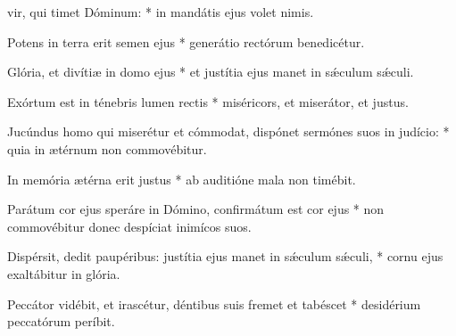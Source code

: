 \begin{psalmus}

     vir, qui timet Dóminum: * in mandátis ejus volet nimis.

    Potens in terra erit semen ejus * generátio rectórum benedicétur.

    Glória, et divítiæ in domo ejus * et justítia ejus manet in sǽculum sǽculi.

    Exórtum est in ténebris lumen rectis * miséricors, et miserátor, et justus.

    Jucúndus homo qui miserétur et cómmodat, dispónet sermónes suos in judício: * quia in ætérnum non commovébitur.

    In memória ætérna erit justus * ab auditióne mala non timébit.

    Parátum cor ejus speráre in Dómino, confirmátum est cor ejus * non commovébitur donec despíciat inimícos suos.

    Dispérsit, dedit paupéribus: justítia ejus manet in sǽculum sǽculi, * cornu ejus exaltábitur in glória.

    Peccátor vidébit, et irascétur, déntibus suis fremet et tabéscet * desidérium peccatórum períbit.

\end{psalmus}
